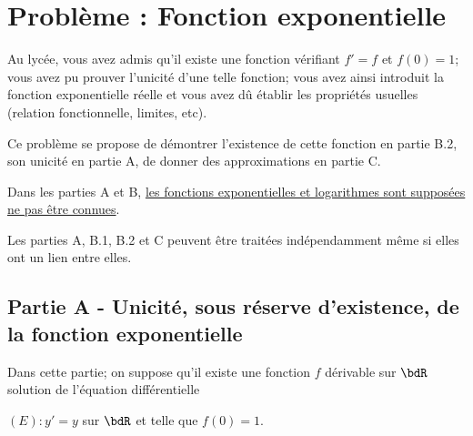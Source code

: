\documentclass[a4paper,french,bookmarks]{article}
\begin{document}

\section*{Problème : Fonction exponentielle}

Au lycée, vous avez admis qu'il existe une fonction vérifiant $f' = f$ et $f(0) = 1$; vous avez pu prouver l'unicité d'une telle fonction; vous avez ainsi introduit la fonction exponentielle réelle et vous avez dû établir les propriétés usuelles (relation fonctionnelle, limites, etc).

Ce problème se propose de démontrer l'existence de cette fonction en partie B.2, son unicité en partie A, de donner des approximations en partie C.

Dans les parties A et B, \underline{les fonctions exponentielles et logarithmes sont supposées ne pas être connues}.

Les parties A, B.1, B.2 et C peuvent être traitées indépendamment même si elles ont un lien entre elles.

\subsection*{Partie A - Unicité, sous réserve d'existence, de la fonction exponentielle}

Dans cette partie; on suppose qu'il existe une fonction $f$ dérivable sur $\bdR$ solution de l'équation différentielle

$(E) : y' = y$ sur $\bdR$ et telle que $f(0) = 1$.
\end{document}
